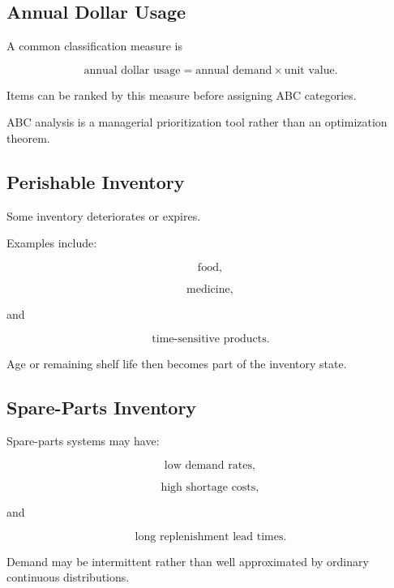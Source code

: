 \subsection{Annual Dollar Usage}
\label{subsec:annual-dollar-usage}

A common classification measure is

\[
\boxed{
\text{annual dollar usage}
=
\text{annual demand}
\times
\text{unit value}.
}
\]

Items can be ranked by this measure before assigning ABC categories.

ABC analysis is a managerial prioritization tool rather than an
optimization theorem.

\subsection{Perishable Inventory}
\label{subsec:perishable-inventory}

Some inventory deteriorates or expires.

Examples include:

\[
\boxed{
\text{food},
}
\]

\[
\boxed{
\text{medicine},
}
\]

and

\[
\boxed{
\text{time-sensitive products}.
}
\]

Age or remaining shelf life then becomes part of the inventory state.

\subsection{Spare-Parts Inventory}
\label{subsec:spare-parts-inventory}

Spare-parts systems may have:

\[
\boxed{
\text{low demand rates},
}
\]

\[
\boxed{
\text{high shortage costs},
}
\]

and

\[
\boxed{
\text{long replenishment lead times}.
}
\]

Demand may be intermittent rather than well approximated by ordinary
continuous distributions.

